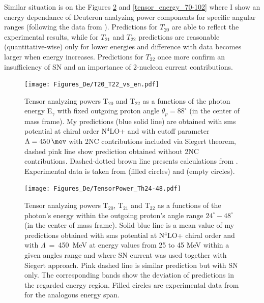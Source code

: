     Similar situation is on the Figures \ref{tensor_energy_24-48} and \ref{tensor_energy_70-102}
    where I show an energy dependance of Deuteron analyzing power components for 
    specific angular ranges (following the data from \cite{rachek2007}).
    Predictions for $T_{20}$ are able to reflect the experimental results,
    while for $T_{21}$ and $T_{22}$ predictions are reasonable (quantitative-wise) 
    only for lower energies and difference with data becomes larger
    when energy increases. Predictions for $T_{22}$ once more 
    confirm an insufficiency of SN and an importance of
    2-nucleon current contributions. 
    

    \begin{figure}[h]
        \begin{center}
        \texttt{[image: Figures\_De/T20\_T22\_vs\_en.pdf]}
        \end{center}
        \caption{Tensor analyzing powers T$_{20}$ and T$_{22}$ as a functions of the photon energy E$_\gamma$
        with fixed outgoing proton angle $\theta_p = 88^{\circ}$ (in the center of mass frame).
        My predictions (blue solid line) are obtained with \gls*{sms} potential at chiral order N$^4$LO+
        and with cutoff parameter $\Lambda = \SI{450}{\mev}$ with 2NC contributions included via Siegert theorem,
        dashed pink line show prediction obtained without 2NC contributions.
        Dashed-dotted brown line presents calculations from \cite{Schmitt1989}.
        Experimental data is taken from \cite{rachek2007} (filled circles)
        and \cite{mishev1993} (empty circles).}
        \label{T20_vs_en}
    \end{figure}

    \begin{figure}[h]
        \begin{center}
        \texttt{[image: Figures\_De/TensorPower\_Th24-48.pdf]}
        \end{center}
        \caption{Tensor analyzing powers T$_{20}$, T$_{21}$ and T$_{22}$ as a functions of the
        photon's energy within the outgoing proton's angle range $24^{\circ} - 48^{\circ}$
        (in the center of mass frame).
        Solid blue line is a mean value of my predictions obtained with
        \gls*{sms} potential at N$^4$LO+ chiral order and with $\Lambda$~=~450~MeV
        at energy values from 25 to 45 MeV within
        a given angles range and
        where SN current was used together with Siegert approach. 
        Pink dashed line is similar prediction but with SN only. 
        The corresponding bands show the deviation of predictions in the regarded
        energy region.
        Filled circles are experimental data
        from \cite{rachek2007} for the analogous energy span.}
        \label{tensor_energy_24-48}
    \end{figure}

